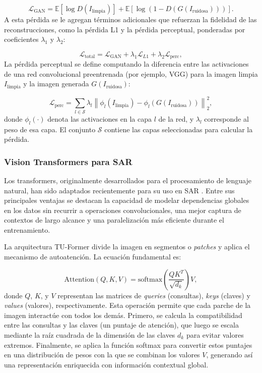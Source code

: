 \begin{equation}
	\mathcal{L}_{\text{GAN}} = \mathbb{E}[\log D(I_{\text{limpia}})] + \mathbb{E}[\log(1-D(G(I_{\text{ruidosa}})))].
\end{equation}
A esta pérdida se le agregan términos adicionales que refuerzan la fidelidad de las reconstrucciones, como la pérdida L1 y la pérdida perceptual, ponderadas por coeficientes $\lambda_1$ y $\lambda_2$:

\begin{equation}
	\mathcal{L}_{\text{total}} = \mathcal{L}_{\text{GAN}} + \lambda_1\mathcal{L}_{L1} + \lambda_2\mathcal{L}_{\text{perc}},
\end{equation}
La pérdida perceptual se define computando la diferencia entre las activaciones de una red convolucional preentrenada (por ejemplo, VGG) para la imagen limpia $I_{\text{limpia}}$ y la imagen generada $G(I_{\text{ruidosa}})$:

\begin{equation}
	\mathcal{L}_{\text{perc}} = 
	\sum_{l \in \mathcal{S}} 
	\lambda_l
	\left\lVert 
	\phi_l(I_{\text{limpia}}) -
	\phi_l(G(I_{\text{ruidosa}}))
	\right\rVert_2^2,
\end{equation}
donde $\phi_l(\cdot)$ denota las activaciones en la capa $l$ de la red, y $\lambda_l$ corresponde al peso de esa capa. El conjunto $\mathcal{S}$ contiene las capas seleccionadas para calcular la pérdida.

\subsubsection{Vision Transformers para SAR}

Los transformers, originalmente desarrollados para el procesamiento de lenguaje natural, han sido adaptados recientemente para su uso en SAR \cite{perera2022sar}. Entre sus principales ventajas se destacan la capacidad de modelar dependencias globales en los datos sin recurrir a operaciones convolucionales, una mejor captura de contextos de largo alcance y una paralelización más eficiente durante el entrenamiento.

La arquitectura TU-Former \cite{tian2023tuformer} divide la imagen en segmentos o \emph{patches} y aplica el mecanismo de autoatención. La ecuación fundamental es:

\begin{equation}
	\text{Attention}(Q,K,V) = \text{softmax}\left(\frac{QK^T}{\sqrt{d_k}}\right)V,
\end{equation}
donde $Q$, $K$, y $V$ representan las matrices de \emph{queries} (consultas), \emph{keys} (claves) y \emph{values} (valores), respectivamente. Esta operación permite que cada parche de la imagen interactúe con todos los demás. Primero, se calcula la compatibilidad entre las consultas y las claves (un puntaje de atención), que luego se escala mediante la raíz cuadrada de la dimensión de las claves $d_k$ para evitar valores extremos. Finalmente, se aplica la función softmax para convertir estos puntajes en una distribución de pesos con la que se combinan los valores $V$, generando así una representación enriquecida con información contextual global.

